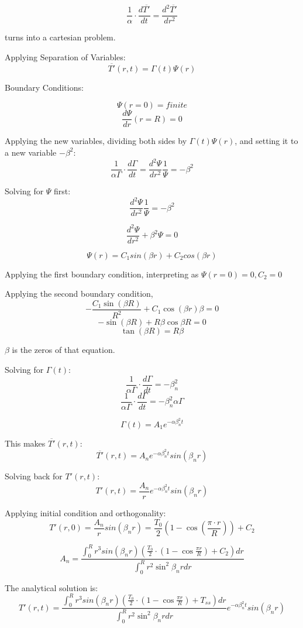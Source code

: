 \documentclass[12pt,letterpaper]{article}
\begin{document}
{{\[\frac{1}{\alpha} \cdot \frac{d\overline{T'}}{dt} = \frac{d^2\overline{T'}}{dr^2} \]

turns into a cartesian problem.

Applying Separation of Variables:
\[\overline{T'}(r,t) = \Gamma (t) \Psi (r)  \]

Boundary Conditions:

\[\Psi(r = 0) = finite \]
\[\frac{d\Psi}{dr} (r = R) = 0 \]

Applying the new variables, dividing both sides by $\Gamma (t) \Psi (r) $,
and setting it to a new variable $ -\beta^2 $:
\[\frac{1}{\alpha  \Gamma} \cdot \frac{d\Gamma}{dt} = \frac{d^2 \Psi}{dr^2} \frac{1}{\Psi} = -\beta^2 \] 

Solving for $\Psi$ first:
\[\frac{d^2 \Psi}{dr^2} \frac{1}{\Psi} = -\beta^2 \]

\[\frac{d^2 \Psi}{dr^2} + \beta^2 \Psi = 0 \]

\[\Psi (r) = C_1 sin(\beta r) + C_2 cos(\beta r) \]

Applying the first boundary condition,
interpreting as $\Psi(r=0) = 0 , C_2 = 0$

Applying the second boundary condition,
\[-\frac{C_1 \sin(\beta R)}{R^2} + C_1 \cos(\beta r) \beta = 0 \]
\[-\sin(\beta R) + R \beta \cos{\beta R} =0 \]
\[\tan(\beta R ) = R\beta \]

$\beta$ is the zeros of that equation.

Solving for $\Gamma(t)$:
\[\frac{1}{\alpha  \Gamma} \cdot \frac{d\Gamma}{dt} = -\beta_n^2 \]
\[\frac{1}{\alpha  \Gamma} \cdot \frac{d\Gamma}{dt} = -\beta_n^2 \alpha \Gamma \]

\[\Gamma(t) = A_1 e^{-\alpha \beta_n^2 t }\]

This makes $\overline{T'}(r,t)$:
\[\overline{T'}(r,t) = A_n e^{-\alpha \beta_n^2 t} sin(\beta_n r)\]

Solving back for $T'(r,t)$:
\[T'(r,t) = \frac{A_n}{r} e^{-\alpha \beta_n^2 t} sin(\beta_n r)\]

Applying initial condition and orthogonality:
\[T'(r,0) = \frac{A_n}{r} sin(\beta_n r) = \frac{T_0}{2} (1-\cos{(\frac{\pi \cdot r}{R})}) + C_2\]

\[A_n = \frac{\int_{0}^{R}  r^3 sin(\beta_n r) (\frac{T_0}{2} \cdot (1-\cos{\frac{\pi r}{R}}) + C_2) dr} {\int_{0}^{R} r^2 \sin^2{\beta_n r} dr }\]

The analytical solution is:
\[T'(r,t) = \frac{\int_{0}^{R}  r^3 sin(\beta_n r) (\frac{T_0}{2} \cdot (1-\cos{\frac{\pi r}{R}}) + T_{ss}) dr} {\int_{0}^{R} r^2 \sin^2{\beta_n r} dr } e^{-\alpha \beta_n^2 t} sin(\beta_n r)\]

}}
\end{document}
